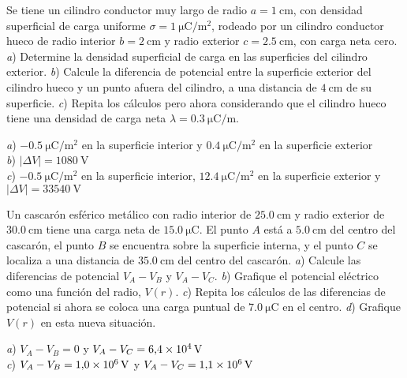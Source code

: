 %
\begin{Exercise}
  Se tiene un cilindro conductor muy largo de radio $a = \SI{1}{\centi\metre}$, con densidad superficial de carga uniforme $\sigma = \SI{1}{\micro\coulomb/\metre\squared}$, rodeado por un cilindro conductor hueco de radio interior $b = \SI{2}{\centi\metre}$ y radio exterior $c = \SI{2.5}{\centi\metre}$, con carga neta cero. \textit{a}) Determine la densidad superficial de carga en las superficies del cilindro exterior. \textit{b}) Calcule la diferencia de potencial entre la superficie exterior del cilindro hueco y un punto afuera del cilindro, a una distancia de $\SI{4}{\centi\metre}$ de su superficie. \textit{c}) Repita los cálculos pero ahora considerando que el cilindro hueco tiene una densidad de carga neta $\lambda = \SI{0.3}{\micro\coulomb/\metre}$.
\end{Exercise}
\begin{Answer}
  \begin{minipage}[t]{.4\textwidth}
    \textit{a}) $\SI{-0.5}{\micro\coulomb/\metre\squared}$ en la superficie interior y $\SI{0.4}{\micro\coulomb/\metre\squared}$ en la superficie exterior\\ \textit{b}) $|\Delta V| = \SI{1080}{\volt}$\\ \textit{c}) $\SI{-0.5}{\micro\coulomb/\metre\squared}$ en la superficie interior, $\SI{12.4}{\micro\coulomb/\metre\squared}$ en la superficie exterior y $|\Delta V| = \SI{33540}{\volt}$
  \end{minipage}
\end{Answer}
%
%
\begin{Exercise}
  Un cascarón esférico metálico con radio interior de $\SI{25.0}{\centi\metre}$ y radio exterior de $\SI{30.0}{\centi\metre}$ tiene una carga neta de $\SI{15.0}{\micro\coulomb}$. El punto $A$ está a $\SI{5.0}{\centi\metre}$ del centro del cascarón, el punto $B$ se encuentra sobre la superficie interna, y el punto $C$ se localiza a una distancia de $\SI{35.0}{\centi\metre}$ del centro del cascarón. \textit{a}) Calcule las diferencias de potencial $V_A-V_B$ y $V_A-V_C$. \textit{b}) Grafique el potencial eléctrico como una función del radio, $V(r)$. \textit{c}) Repita los cálculos de las diferencias de potencial si ahora se coloca una carga puntual de $\SI{7.0}{\micro\coulomb}$ en el centro. \textit{d}) Grafique $V(r)$ en esta nueva situación.
\end{Exercise}
\begin{Answer}
	\begin{minipage}[t]{.4\textwidth}
    \textit{a}) $V_A-V_B = 0$ y $V_A-V_C = \SI{6.4E4}{\volt}$\\ \textit{c}) $V_A-V_B = \SI{1.0E6}{\volt}$ y $V_A-V_C = \SI{1.1E6}{\volt}$
  \end{minipage}
\end{Answer}
